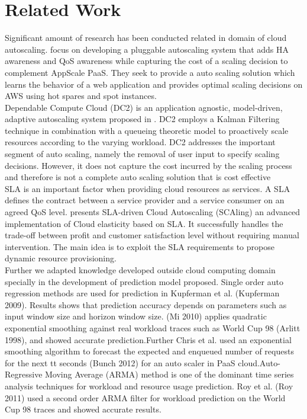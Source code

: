 \section{Related Work}
Significant amount of research has been conducted related in domain of cloud autoscaling. 
\cite{pluggable} focus on developing a pluggable autoscaling system that adds HA awareness and QoS awareness while capturing the cost of a scaling decision to complement AppScale PaaS. They seek to provide a auto scaling solution which learns the behavior of a web application and provides optimal scaling decisions on AWS using hot spares and spot instances.\\
Dependable Compute Cloud (DC2) is an application agnostic, model-driven, adaptive autoscaling system proposed in \cite{modeldriven}. DC2 employs a Kalman Filtering technique in combination with a queueing theoretic model to proactively scale resources according to the varying workload. DC2 addresses the important segment of auto scaling, namely the removal of user input to specify scaling decisions. However, it does not capture the cost incurred by the scaling process and therefore is not a complete auto scaling solution that is cost effective\\

SLA is an important factor when providing cloud resources as services. A SLA defines the contract between a service provider and a service consumer on an agreed QoS level. \cite{sladriven} presents SLA-driven Cloud Autoscaling (SCAling) an advanced implementation of Cloud elasticity based on SLA. It successfully handles the trade-off between profit and customer satisfaction level without requiring manual intervention. The main idea is to exploit the SLA requirements to propose dynamic resource provisioning.\\

Further we adapted knowledge developed outside cloud computing domain specially in the development of prediction model proposed. Single order auto regression methods are used for prediction in Kupferman et al. (Kupferman 2009). Results shows that prediction accuracy depends on parameters such as input window size and horizon window size. (Mi 2010) applies quadratic exponential smoothing against real workload traces such as World Cup 98 (Arlitt 1998), and showed accurate prediction.Further Chris et al. used an exponential smoothing algorithm to forecast the expected and enqueued number of requests  for the next tt seconds (Bunch 2012) for an auto scaler in PaaS cloud.Auto-Regressive Moving Average (ARMA) method is one of the dominant time series analysis techniques for workload and resource usage prediction. Roy et al. (Roy 2011) used a second order ARMA filter for workload prediction on the World Cup 98 traces and showed accurate results.\\

